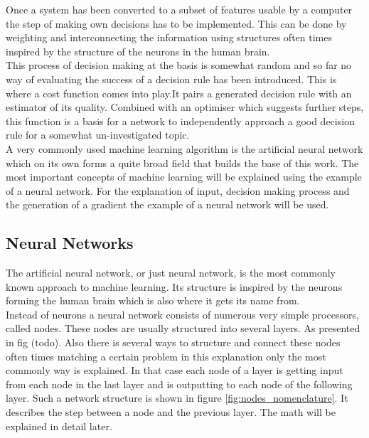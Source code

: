 Once a system has been converted to a subset of features usable by a computer the step of making own decisions has to be implemented. This can be done by weighting and interconnecting the information using structures often times inspired by the structure of the neurons in the human brain.\\
This process of decision making at the basis is somewhat random and so far no way of evaluating the success of a decision rule has been introduced. This is where a cost function comes into play.It pairs a generated decision rule with an estimator of its quality. Combined with an optimiser which suggests further steps, this function is a basis for a network to independently approach a good decision rule for a somewhat un-investigated topic.\\
A very commonly used machine learning algorithm is the artificial neural network which on its own forms a quite broad field that builds the base of this work. The most important concepts of machine learning will be explained using the example of a neural network. For the explanation of input, decision making process and the generation of a gradient the example of a neural network will be used.

\subsection{Neural Networks}

The artificial neural network, or just neural network, is the most commonly known approach to machine learning. Its structure is inspired by the neurons forming the human brain which is also where it gets its name from.\\
Instead of neurons a neural network consists of numerous very simple processors, called nodes. These nodes are usually structured into several layers. As presented in fig (todo). Also there is several ways to structure and connect these nodes often times matching a certain problem in this explanation only the most commonly way is explained. In that case each node of a layer is getting input from each node in the last layer and is outputting to each node of the following layer. Such a network structure is shown in figure \ref{fig:nodes_nomenclature}. It describes the step between a node and the previous layer. The math will be explained in detail later.

